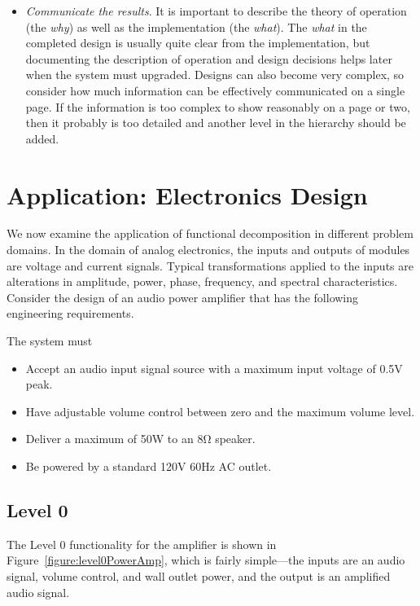 \begin{itemize}
\item
  \emph{Communicate the results}. It is important to describe the theory
  of operation (the \emph{why}) as well as the implementation (the
  \emph{what}). The \emph{what} in the completed design is usually quite
  clear from the implementation, but documenting the description of
  operation and design decisions helps later when the system must
  upgraded. Designs can also become very complex, so consider how much
  information can be effectively communicated on a single page. If the
  information is too complex to show reasonably on a page or two, then
  it probably is too detailed and another level in the hierarchy should
  be added.
\end{itemize}

\section{Application: Electronics Design}
\label{section:application-electronics-design}

We now examine the application of functional decomposition in different
problem domains. In the domain of analog electronics, the inputs and
outputs of modules are voltage and current signals. Typical
transformations applied to the inputs are alterations in amplitude,
power, phase, frequency, and spectral characteristics. Consider the
design of an audio power amplifier that has the following engineering
requirements.

The system must

\begin{itemize}
\item
  Accept an audio input signal source with a maximum input voltage of
  0.5V peak.
\item
  Have adjustable volume control between zero and the maximum volume
  level.
\item
  Deliver a maximum of 50W to an 8Ω speaker.
\item
  Be powered by a standard 120V 60Hz AC outlet.
\end{itemize}

\subsection*{Level 0}
\label{subsection:level-0}
The Level 0 functionality for the amplifier is shown in 
Figure~\ref{figure:level0PowerAmp},
which is fairly simple---the inputs are an audio signal, volume control,
and wall outlet power, and the output is an amplified audio signal.

